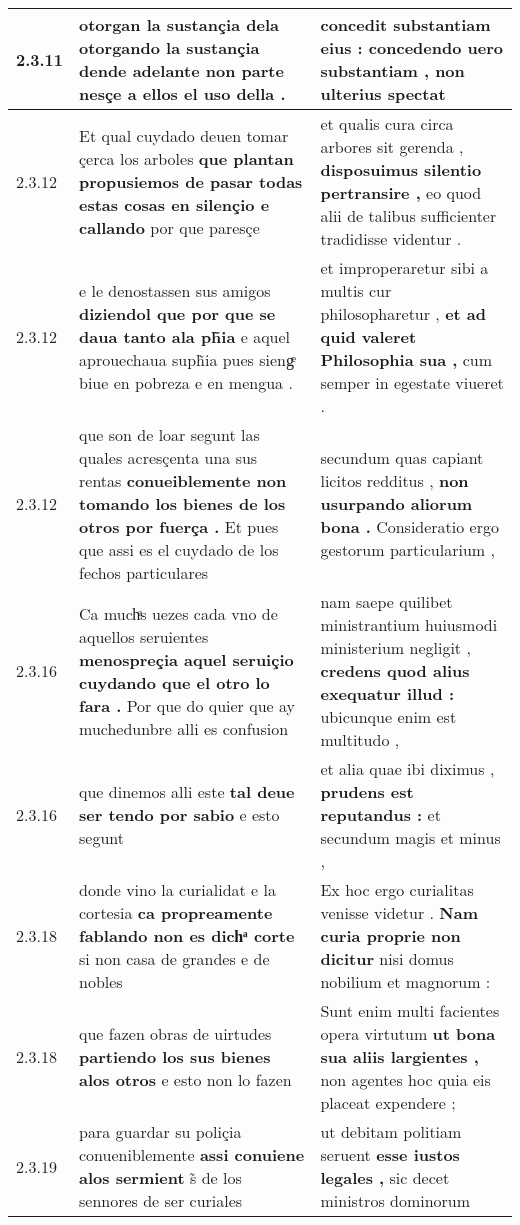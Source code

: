 \begin{tabular}{|p{1cm}|p{6.5cm}|p{6.5cm}|}
2.3.11 & otorgan la sustançia dela \textbf{ otorgando la sustançia } dende adelante non parte nesçe a ellos el uso della . & concedit substantiam eius : \textbf{ concedendo uero substantiam , } non ulterius spectat \\\hline
2.3.12 & Et qual cuydado deuen tomar çerca los arboles \textbf{ que plantan propusiemos de pasar todas estas cosas en silençio e callando } por que paresçe & et qualis cura circa arbores sit gerenda , \textbf{ disposuimus silentio pertransire , } eo quod alii de talibus sufficienter tradidisse videntur . \\\hline
2.3.12 & e le denostassen sus amigos \textbf{ diziendol que por que se daua tanto ala ph̃ia } e aquel aprouechaua suph̃ia pues siengͤ biue en pobreza e en mengua . & et improperaretur sibi a multis cur philosopharetur , \textbf{ et ad quid valeret Philosophia sua , } cum semper in egestate viueret . \\\hline
2.3.12 & que son de loar segunt las quales acresçenta una sus rentas \textbf{ conueiblemente non tomando los bienes de los otros por fuerça . } Et pues que assi es el cuydado de los fechos particulares & secundum quas capiant licitos redditus , \textbf{ non usurpando aliorum bona . } Consideratio ergo gestorum particularium , \\\hline
2.3.16 & Ca muchͣs uezes cada vno de aquellos seruientes \textbf{ menospreçia aquel seruiçio cuydando que el otro lo fara . } Por que do quier que ay muchedunbre alli es confusion & nam saepe quilibet ministrantium huiusmodi ministerium negligit , \textbf{ credens quod alius exequatur illud : } ubicunque enim est multitudo , \\\hline
2.3.16 & que dinemos alli este \textbf{ tal deue ser tendo por sabio } e esto segunt & et alia quae ibi diximus , \textbf{ prudens est reputandus : } et secundum magis et minus , \\\hline
2.3.18 & donde vino la curialidat e la cortesia \textbf{ ca propreamente fablando non es dichͣ corte } si non casa de grandes e de nobles & Ex hoc ergo curialitas venisse videtur . \textbf{ Nam curia proprie non dicitur } nisi domus nobilium et magnorum : \\\hline
2.3.18 & que fazen obras de uirtudes \textbf{ partiendo los sus bienes alos otros } e esto non lo fazen & Sunt enim multi facientes opera virtutum \textbf{ ut bona sua aliis largientes , } non agentes hoc quia eis placeat expendere ; \\\hline
2.3.19 & para guardar su poliçia conueniblemente \textbf{ assi conuiene alos sermient } s̃ de los sennores de ser curiales & ut debitam politiam seruent \textbf{ esse iustos legales , } sic decet ministros dominorum \\\hline

\end{tabular}

